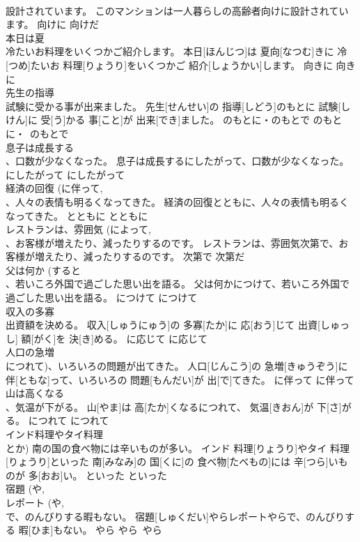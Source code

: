 \documentclass[8pt]{extreport}
\begin{document}
\begin{CJK}{UTF8}{min}
\\	設計されています。	このマンションは一人暮らしの高齢者向けに設計されています。	向けに	向けだ	
\\	本日は夏 
\\	冷たいお料理をいくつかご紹介します。	本日[ほんじつ]は 夏向[なつむ]きに 冷[つめ]たいお 料理[りょうり]をいくつかご 紹介[しょうかい]します。	向きに	向きに	
\\	先生の指導 
\\	試験に受かる事が出来ました。	先生[せんせい]の 指導[しどう]のもとに 試験[しけん]に 受[う]かる 事[こと]が 出来[でき]ました。	のもとに・のもとで	のもとに・~のもとで	
\\	息子は成長する 
\\	、口数が少なくなった。	息子は成長するにしたがって、口数が少なくなった。	にしたがって	にしたがって	
\\	経済の回復 (に伴って, 
\\	、人々の表情も明るくなってきた。	経済の回復とともに、人々の表情も明るくなってきた。	とともに	とともに	
\\	レストランは、雰囲気 (によって, 
\\	、お客様が増えたり、減ったりするのです。	レストランは、雰囲気次第で、お客様が増えたり、減ったりするのです。	次第で	次第だ	
\\	父は何か (すると 
\\	、若いころ外国で過ごした思い出を語る。	父は何かにつけて、若いころ外国で過ごした思い出を語る。	につけて	につけて	
\\	収入の多寡 
\\	出資額を決める。	収入[しゅうにゅう]の 多寡[たか]に 応[おう]じて 出資[しゅっし] 額[がく]を 決[き]める。	に応じて	に応じて	
\\	人口の急増 
\\	につれて)、いろいろの問題が出てきた。	人口[じんこう]の 急増[きゅうぞう]に 伴[ともな]って、いろいろの 問題[もんだい]が 出[で]てきた。	に伴って	に伴って	
\\	山は高くなる 
\\	、気温が下がる。	山[やま]は 高[たか]くなるにつれて、 気温[きおん]が 下[さ]がる。	につれて	につれて	
\\	インド料理やタイ料理 
\\	とか) 南の国の食べ物には辛いものが多い。	インド 料理[りょうり]やタイ 料理[りょうり]といった 南[みなみ]の 国[くに]の 食べ物[たべもの]には 辛[つら]いものが 多[おお]い。	といった	といった	
\\	宿題 (や, 
\\	レポート (や, 
\\	で、のんびりする暇もない。	宿題[しゅくだい]やらレポートやらで、のんびりする 暇[ひま]もない。	やら	やら~やら	

\end{CJK}
\end{document}
